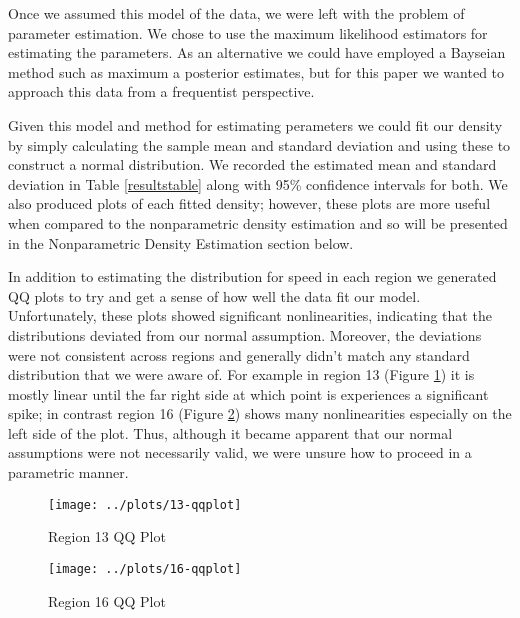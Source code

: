 \documentclass[12pt]{article}
\begin{document}
Once we assumed this model of the data, we were left with the problem of parameter estimation. We chose to use the maximum likelihood estimators for estimating the parameters. As an alternative we could have employed a Bayseian method such as maximum a posterior estimates, but for this paper we wanted to approach this data from a frequentist perspective.

Given this model and method for estimating perameters we could fit our density by simply  calculating the sample mean and standard deviation and using these to construct a normal distribution. We recorded the estimated mean and standard deviation in  Table \ref{resultstable} along with 95\% confidence intervals for both. We also produced plots of each fitted density; however, these plots are more useful when compared to the nonparametric density estimation and so will be presented in the Nonparametric Density Estimation section below.

In addition to estimating the distribution for speed in each region we generated QQ plots to try and get a sense of how well the data fit our model. Unfortunately, these plots showed significant nonlinearities, indicating that the distributions deviated from our normal assumption. Moreover, the deviations were not consistent across regions and generally didn't match any standard distribution that we were aware of. For example in region 13 (Figure \ref{region13qq}) it is mostly linear until the far right side at which point is experiences a significant spike; in contrast region 16 (Figure \ref{region16qq}) shows many nonlinearities especially on the left side of the plot. Thus, although it became apparent that our normal assumptions were not necessarily valid, we were unsure how to proceed in a parametric manner.
\begin{figure}[!ht]
\centering
\texttt{[image: ../plots/13-qqplot]}
\caption{Region 13 QQ Plot}
\label{region13qq}
\end{figure}
\begin{figure}[!ht]
\centering
\texttt{[image: ../plots/16-qqplot]}
\caption{Region 16 QQ Plot}
\label{region16qq}
\end{figure}
\end{document}
